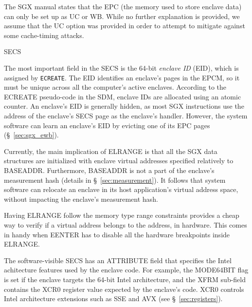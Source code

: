 The SGX manual states that the EPC (the memory used to store enclave data) can
only be set up as UC or WB. While no further explanation is provided, we assume
that the UC option was provided in order to attempt to mitigate against some
cache-timing attacks.



SECS


The most important field in the SECS is the 64-bit \textit{enclave ID} (EID),
which is assigned by \texttt{ECREATE}. The EID identifies an enclave's pages in
the EPCM, so it must be unique across all the computer's active enclaves.
According to the ECREATE pseudo-code in the SDM, enclave IDs are allocated
using an atomic counter. An enclave's EID is generally hidden, as most SGX
instructions use the address of the enclave's SECS page as the enclave's
handler. However, the system software can learn an enclave's EID by evicting
one of its EPC pages (\S~\ref{sec:sgx_ewb}).



Currently, the main implication of ELRANGE is that all the SGX data structures
are initialized with enclave virtual addresses specified relatively to
BASEADDR. Furthermore, BASEADDR is not a part of the enclave's measurement
hash (details in \S~\ref{sec:measurement}). It follows that system software can
relocate an enclave in its host application's virtual address space, without
impacting the enclave's measurement hash.

Having ELRANGE follow the memory type range constraints provides a cheap way to
verify if a virtual address belongs to the address, in hardware. This comes in
handy when EENTER has to disable all the hardware breakpoints inside ELRANGE.



The software-visible SECS has an ATTRIBUTE field that specifies the Intel
achitecture features used by the enclave code. For example, the MODE64BIT flag
is set if the enclave targets the 64-bit Intel architecture, and the XFRM
sub-field contains the XCR0 register value expected by the enclave's code. XCR0
controls Intel architecture extensions such as SSE and AVX (see
\S~\ref{sec:registers}).

